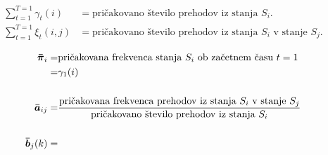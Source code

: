 \begin{align*}
\sum_{t=1}^{T=1} \gamma_t(i) &= \text{pričakovano število prehodov iz stanja $S_i$.} \\
\sum_{t=1}^{T=1} \xi_t(i, j) &= \text{pričakovano število prehodov iz stanja $S_i$ v stanje $S_j$.}
\end{align*}

\begin{align}
\boldsymbol{\bar{\pi}}_i =& \text{pričakovana frekvenca stanja $S_i$ ob začetnem času $t=1$} \nonumber \\
=& \gamma_1(i)
\\[\baselineskip]
\boldsymbol{\bar{a}}_{ij} =& \frac{
\text{pričakovana frekvenca prehodov iz stanja $S_i$ v stanje $S_j$}
}{
\text{pričakovano število prehodov iz stanja $S_i$}
}
\\[\baselineskip]
\boldsymbol{\bar{b}}_j(k) =& \frac{
\text{}
}{
\text{}
}
\end{align}
